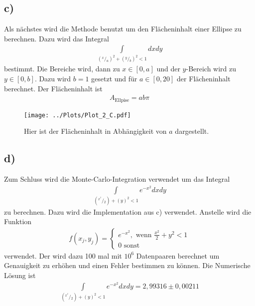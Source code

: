 \subsection*{c)}
Als nächstes wird die Methode benutzt um den Flächeninhalt einer Ellipse zu berechnen.
Dazu wird das Integral
\begin{align}
\int\limits_{(^x\!/\!_a)^2+(^y\!/\!_b)^2<1}dxdy
\end{align}
bestimmt.
Die Bereiche wird, dann zu $x\in[0,a]$ und der $y$-Bereich wird zu $y\in[0,b]$.
Dazu wird $b=1$ gesetzt und für $a\in[0,20]$ der Flächeninhalt berechnet.
Der Flächeninhalt ist 
\begin{align}
	A_\text{Ellpise}=ab\pi
\end{align}
\begin{figure}[h!]
	\centering
	\texttt{[image: ../Plots/Plot\_2\_C.pdf]}
	\caption{Hier ist der Flächeninhalt in Abhängigkeit von $a$ dargestellt.}
\end{figure}
\subsection*{d)}
Zum Schluss wird die Monte-Carlo-Integration verwendet um das Integral
\begin{align}
	\int\limits_{(^x^{{}^2}\!/\!_2)+(y)^2<1} e^{-x^2}dxdy
\end{align}
zu berechnen.
Dazu wird die Implementation aus c) verwendet.
Anstelle wird die Funktion
\begin{align}
	f(x_j,y_j)=
	\begin{cases}
		e^{-x^2},\text{ wenn }\frac{x^2}{2}+y^2<1\\
		0\text{ sonst}
	\end{cases}
\end{align}
verwendet.
Der wird dazu 100 mal mit $10^6$ Datenpaaren berechnet um Genauigkeit zu erhöhen und einen Fehler bestimmen zu können.
Die Numerische Lösung ist
\begin{align}
	\int\limits_{(^x^{{}^2}\!/\!_2)+(y)^2<1} e^{-x^2}dxdy=2,99316\pm0,00211
\end{align}